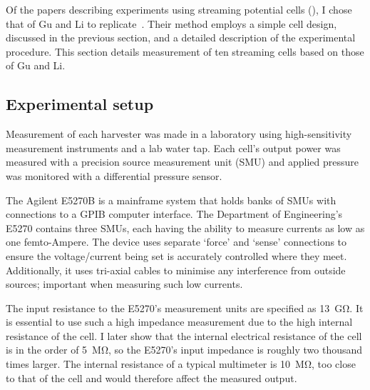   Of the papers describing experiments using streaming potential cells (\cite{Gu2000,Mala1997,Scales1992,VanderHeyden2006}), I chose that of Gu and Li to replicate~\cite{Gu2000}.
  Their method employs a simple cell design, discussed in the previous section, and a detailed description of the experimental procedure.
  This section details measurement of ten streaming cells based on those of Gu and Li.


  \subsection{Experimental setup}
    \label{sub:part1_energyHarvesting_measuringStreamingCells_experimentalSetup}


    Measurement of each harvester was made in a laboratory using high-sensitivity measurement instruments and a lab water tap.
    Each cell's output power was measured with a precision source measurement unit (SMU) and applied pressure was monitored with a differential pressure sensor.

    The Agilent E5270B is a mainframe system that holds banks of SMUs with connections to a GPIB computer interface.
    The Department of Engineering's E5270 contains three SMUs, each having the ability to measure currents as low as one femto-Ampere.
    The device uses separate `force' and `sense' connections to ensure the voltage/current being set is accurately controlled where they meet.
    Additionally, it uses tri-axial cables to minimise any interference from outside sources; important when measuring such low currents.

    The input resistance to the E5270's measurement units are specified as \SI{13}{\giga\ohm}.
    It is essential to use such a high impedance measurement due to the high internal resistance of the cell.
    I later show that the internal electrical resistance of the cell is in the order of \SI{5}{\mega\ohm}, so the E5270's input impedance is roughly two thousand times larger.
    The internal resistance of a typical multimeter is \SI{10}{\mega\ohm}, too close to that of the cell and would therefore affect the measured output.

